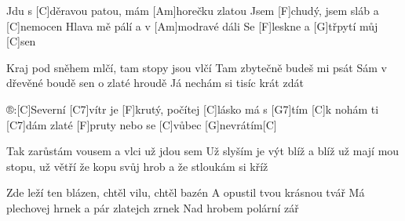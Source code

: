 
Jdu s [C]děravou patou, mám [Am]horečku zlatou
Jsem [F]chudý, jsem sláb a [C]nemocen
Hlava mě pálí a v [Am]modravé dáli
Se [F]leskne a [G]třpytí můj [C]sen

Kraj pod sněhem mlčí, tam stopy jsou vlčí
Tam zbytečně budeš mi psát
Sám v dřevěné boudě sen o zlaté hroudě
Já nechám si tisíc krát zdát

®:[C]Severní [C7]vítr je [F]krutý, 
počítej [C]lásko má s [G7]tím
[C]k nohám ti [C7]dám zlaté [F]pruty
nebo se [C]vůbec [G]nevrátím[C]

Tak zarůstám vousem a vlci už jdou sem
Už slyším je výt blíž a blíž
už mají mou stopu, už větří že kopu
svůj hrob a že stloukám si kříž

Zde leží ten blázen, chtěl vilu, chtěl bazén
A opustil tvou krásnou tvář
Má plechovej hrnek a pár zlatejch zrnek
Nad hrobem polární zář
\slpc